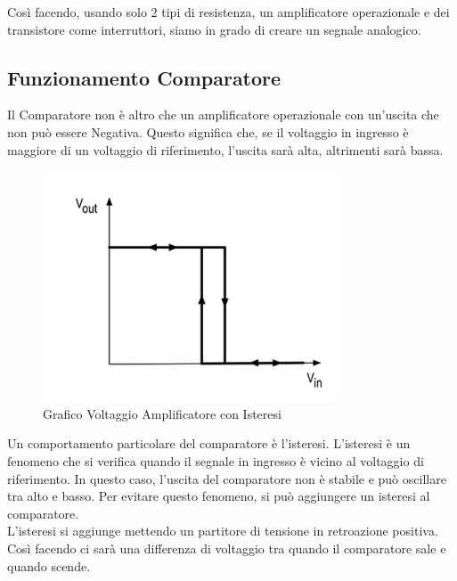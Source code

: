 Così facendo, usando solo 2 tipi di resistenza, un amplificatore operazionale e dei transistore come interruttori, siamo in grado di creare un segnale analogico.\\
\pagebreak
\subsection{Funzionamento Comparatore}
Il Comparatore non è altro che un amplificatore operazionale con un'uscita che non può essere Negativa. Questo significa che, se il voltaggio in ingresso è maggiore di un voltaggio di riferimento, l'uscita sarà alta, altrimenti sarà bassa.\\

\begin{figure}
    \centering
    \includegraphics[width=\linewidth]{microcontrollore/assets/Hysteresis.png}
    \caption{Grafico Voltaggio Amplificatore con Isteresi}
    \label{fig:Comparatore}
\end{figure}
Un comportamento particolare del comparatore è l'isteresi. L'isteresi è un fenomeno che si verifica quando il segnale in ingresso è vicino al voltaggio di riferimento. In questo caso, l'uscita del comparatore non è stabile e può oscillare tra alto e basso. Per evitare questo fenomeno, si può aggiungere un isteresi al comparatore.\\
L'isteresi si aggiunge mettendo un partitore di tensione in retroazione positiva. Così facendo ci sarà una differenza di voltaggio tra quando il comparatore sale e quando scende.\\

